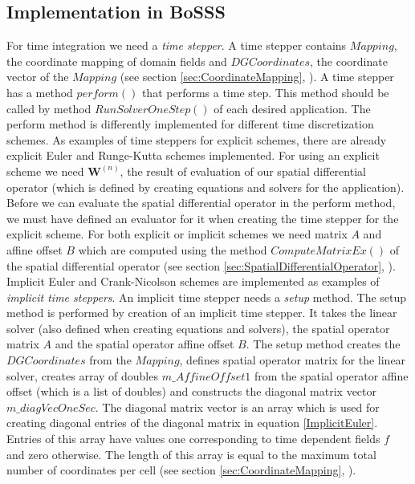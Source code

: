 \documentclass[BoSSSForSolvingConservationLaws.tex]{subfiles}
\begin{document}
\subsection*{Implementation in BoSSS}
For time integration we need a \emph{time stepper}. A time stepper contains $Mapping$, the coordinate mapping of domain fields and $DGCoordinates$, the coordinate vector of the $Mapping$ (see section \ref{sec:CoordinateMapping}, ). A time stepper has a method $perform()$ that performs a time step. This method should be called by method $RunSolverOneStep()$ of each desired application. The perform method is differently implemented for different time discretization schemes. As examples of time steppers for explicit schemes, there are already explicit Euler and Runge-Kutta schemes implemented. For using an explicit scheme we need $\textbf{W}^{(n)}$, the result of evaluation of our spatial differential operator (which is defined by creating equations and solvers for the application). Before we can evaluate  the spatial differential operator in the perform method, we must have defined an evaluator  for it when creating the time stepper for the explicit scheme. For both explicit or implicit schemes we need matrix $A$ and affine offset $B$ which are computed using the method $ComputeMatrixEx()$ of the spatial differential operator (see section \ref{sec:SpatialDifferentialOperator}, ).\\
Implicit Euler and Crank-Nicolson schemes are implemented as examples of \emph{implicit time steppers}. An implicit time stepper needs a \emph{setup} method. The setup method is performed by creation of an implicit time stepper. It takes the linear solver (also defined when creating equations and solvers), the spatial operator matrix $A$ and the spatial operator affine offset $B$. The setup method creates the $DGCoordinates$ from the $Mapping$, defines spatial operator matrix for the linear solver, creates array of doubles $m\_AffineOffset1$ from the spatial operator affine offset (which is a list of doubles) and constructs the diagonal matrix vector $m\_diagVecOneSec$. The diagonal matrix vector is an array which is used for creating diagonal entries of the diagonal matrix in equation \eqref{ImplicitEuler}. Entries of this array have values one corresponding to time dependent fields $f$ and zero otherwise. The length of this array is equal to the maximum total number of coordinates per cell (see section \ref{sec:CoordinateMapping}, ).\\
\end{document}
